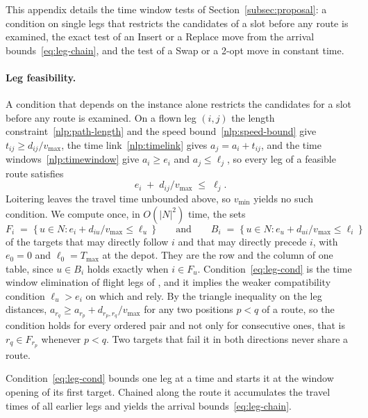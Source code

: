\documentclass[11pt]{article}
\begin{document}
This appendix details the time window tests of Section~\ref{subsec:proposal}: a condition on single legs that restricts the candidates of a slot before any route is examined, the exact test of an Insert or a Replace move from the arrival bounds~\eqref{eq:leg-chain}, and the test of a Swap or a 2-opt move in constant time.

\paragraph{Leg feasibility.}
A condition that depends on the instance alone restricts the candidates for a slot before any route is examined. On a flown leg $(i,j)$ the length constraint~\eqref{nlp:path-length} and the speed bound~\eqref{nlp:speed-bound} give $t_{ij} \ge d_{ij}/v_{\max}$, the time link~\eqref{nlp:timelink} gives $a_j = a_i + t_{ij}$, and the time windows~\eqref{nlp:timewindow} give $a_i \ge e_i$ and $a_j \le \ell_j$, so every leg of a feasible route satisfies
\begin{equation}\label{eq:leg-cond}
    e_i \;+\; d_{ij} / v_{\max} \;\le\; \ell_j .
\end{equation}
Loitering leaves the travel time unbounded above, so $v_{\min}$ yields no such condition. We compute once, in $O(|N|^2)$ time, the sets
\begin{equation}\label{eq:fb-sets}
    F_i \;=\; \{\, u \in N : e_i + d_{iu}/v_{\max} \le \ell_u \,\}
    \qquad \text{and} \qquad
    B_i \;=\; \{\, u \in N : e_u + d_{ui}/v_{\max} \le \ell_i \,\}
\end{equation}
of the targets that may directly follow $i$ and that may directly precede $i$, with $e_0 = 0$ and $\ell_0 = T_{\max}$ at the depot. They are the row and the column of one table, since $u \in B_i$ holds exactly when $i \in F_u$. Condition~\eqref{eq:leg-cond} is the time window elimination of flight legs of \citep{desrochers1991improvements}, and it implies the weaker compatibility condition $\ell_u > e_i$ on which \citep{vansteenwegen2009iterated} and \citep{gunawan2015iterated} rely. By the triangle inequality on the leg distances, $a_{r_q} \ge a_{r_p} + d_{r_p, r_q}/v_{\max}$ for any two positions $p < q$ of a route, so the condition holds for every ordered pair and not only for consecutive ones, that is $r_q \in F_{r_p}$ whenever $p < q$. Two targets that fail it in both directions never share a route.

Condition~\eqref{eq:leg-cond} bounds one leg at a time and starts it at the window opening of its first target. Chained along the route it accumulates the travel times of all earlier legs and yields the arrival bounds~\eqref{eq:leg-chain}.
\end{document}
